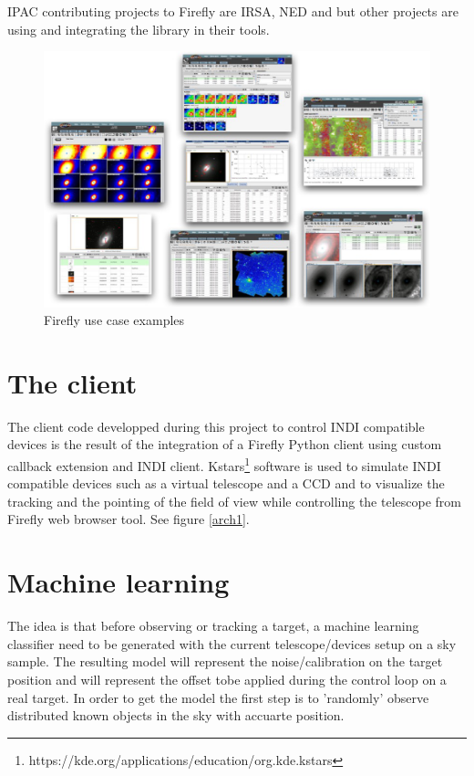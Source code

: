 \documentclass[11pt,twoside]{article}
\begin{document}
IPAC contributing projects to Firefly are IRSA, NED and but other projects are using and integrating the library in their tools.

\begin{figure}[ht]
   \includegraphics[scale=.5]{ff.eps}
    \caption{Firefly use case examples}
    \label{ff}
\end{figure}

\section{The client}

The client code developped during this project to control INDI compatible devices is the result of the integration of a Firefly Python client using custom callback extension and INDI client.
Kstars\footnote{https://kde.org/applications/education/org.kde.kstars} software is used to simulate INDI compatible devices such as a virtual telescope and a CCD and to visualize the tracking and the pointing of the field of view while controlling the telescope from Firefly web browser tool. See figure \ref{arch1}.

\section{Machine learning}

The idea is that before observing or tracking a target, a machine learning classifier need to be generated with the current telescope/devices setup on a sky sample.
The resulting model will represent the noise/calibration on the target position and will represent the offset tobe applied during the control loop on a real target.
In order to get the model the first step is to 'randomly' observe distributed known objects in the sky with accuarte position.
\end{document}
